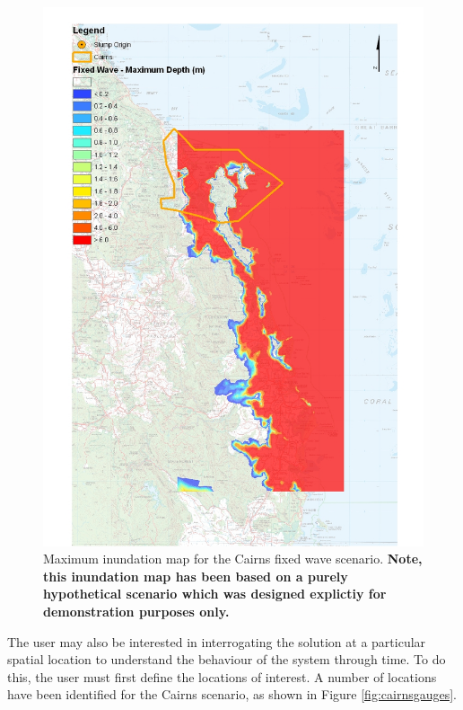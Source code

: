 \documentclass{manual}
\begin{document}
\begin{figure}[htp]
  \centerline{\includegraphics[scale=0.5]{graphics/fixedwavedepth.jpg}}
  \caption{Maximum inundation map for the Cairns fixed wave scenario.
           \bf Note, this inundation map has been based on a purely hypothetical scenario which was
           designed explictiy for demonstration purposes only.}
  \label{fig:maxdepthcairnsfixedwave}
\end{figure}

\clearpage

The user may also be interested in interrogating the solution at a particular spatial
location to understand the behaviour of the system through time. To do this, the user
must first define the locations of interest. A number of locations have been
identified for the Cairns scenario, as shown in Figure \ref{fig:cairnsgauges}.
\end{document}
